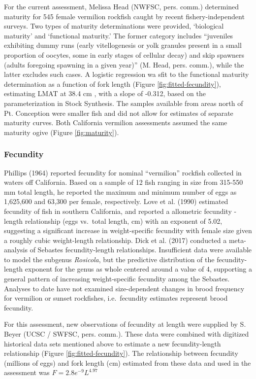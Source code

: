\documentclass[
  english,
  a4paper,
]{article}
\begin{document}
For the current assessment, Melissa Head (NWFSC, pers. comm.) determined maturity
for 545 female vermilion rockfish caught by recent fishery-independent surveys. Two types
of maturity determinations were provided, `biological maturity' and `functional
maturity.' The former category includes ``juveniles exhibiting dummy runs (early
vitellogenesis or yolk granules present in a small proportion of oocytes, some
in early stages of cellular decay) and skip spawners (adults foregoing spawning
in a given year)'' (M. Head, pers. comm.), while the latter excludes such cases.
A logistic regression wa sfit to the functional maturity determination as a function of fork length (Figure \ref{fig:fitted-fecundity}), estimating LMAT at 38.4 cm , with a slope of -0.312,
based on the parameterization in Stock Synthesis. The samples available from areas north of Pt. Conception were smaller fish and did not allow for estimates of separate
maturity curves. Both California vermilion assessments assumed the same maturity
ogive (Figure \ref{fig:maturity}).

\hypertarget{fecundity}{%
\subsubsection{Fecundity}\label{fecundity}}

Phillips (1964) reported fecundity for nominal ``vermilion'' rockfish collected in waters off California. Based on a sample of 12 fish ranging in size from 315-550 mm total length, he reported the maximum and minimum number of eggs as 1,625,600 and 63,300 per female, respectively. Love et al. (1990) estimated fecundity of fish in southern California, and reported a allometric fecundity - length relationship (eggs vs.~total length, cm) with an exponent of 5.02, suggesting a significant increase in weight-specific fecundity with female size given a roughly cubic weight-length relationship. Dick et al. (2017) conducted a meta-analysis of Sebastes fecundity-length relationships. Insufficient data were available to model the subgenus \emph{Rosicola}, but the predictive distribution of the fecundity-length exponent for the genus as whole centered around a value of 4, supporting a general pattern of increasing weight-specific fecundity among the Sebastes. Analyses to date have not examined size-dependent changes in brood frequency for vermilion or sunset rockfishes, i.e.~fecundity estimates represent brood fecundity.

For this assessment, new observations of fecundity at length were supplied by S. Beyer (UCSC / SWFSC, pers. comm.). These data were combined with digitized historical data sets mentioned above to estimate a new fecundity-length relationship (Figure \ref{fig:fitted-fecundity}). The relationship between fecundity (millions of eggs) and fork length (cm) estimated from these data and used in the assessment was
\(F = 2.8e^{-9}L^{4.97}\)
\end{document}
